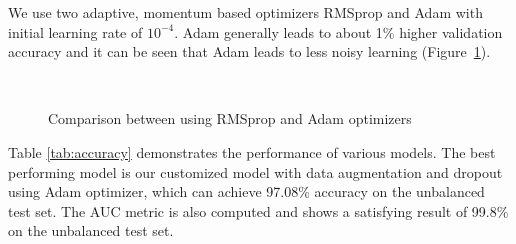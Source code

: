 \documentclass[journal, 12pt, onecolumn,draftclsnofoot]{IEEEtran}
\begin{document}
\begin{figure}[h]
\end{figure}

We use two adaptive, momentum based optimizers RMSprop and Adam \cite{Adam} with initial learning rate of $10^{-4}$. Adam generally leads to about 1\% higher validation accuracy and it can be seen that Adam leads to less noisy learning (Figure~\ref{fig:Adam_vs_RMSprop}). 


\begin{figure}[h]{\centering
{}
\\
\caption{\small{Comparison between using RMSprop and Adam optimizers}}
\label{fig:Adam_vs_RMSprop}
}
\end{figure}

Table \ref{tab:accuracy} demonstrates the performance of various models. The best performing model is our customized model with data augmentation and dropout using Adam optimizer, which can achieve 97.08\% accuracy on the unbalanced test set. The AUC metric is also computed and shows a satisfying result of 99.8\% on the unbalanced test set. 
\end{document}
